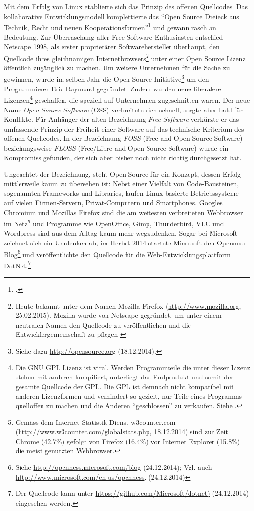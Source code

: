 \documentclass[
paper=164mm:234mm, %
pagesize, %
DIV=calc, %
10pt, %
parskip=half- %
]{scrbook}
\begin{document}
Mit dem Erfolg von Linux etablierte sich das Prinzip des offenen Quellcodes. Das kollaborative Entwicklungsmodell komplettierte das \enquote{Open Source Dreieck aus Technik, Recht und neuen Kooperationsformen}\footnote{\cite{Deterding:2007}.} und gewann rasch an Bedeutung. Zur Überraschung aller Free Software Enthusiasten entschied Netscape 1998, als erster proprietärer Softwarehersteller überhaupt, den Quellcode ihres gleichnamigen Internetbrowsers\footnote{Heute bekannt unter dem Namen Mozilla Firefox (\url{http://www.mozilla.org}, 25.02.2015). Mozilla wurde von Netscape gegründet, um unter einem neutralen Namen den Quellcode zu veröffentlichen und die Entwicklergemeinschaft zu pflegen \cite[91]{Hamerly-Paquin-Walton:1999}} unter einer Open Source Lizenz öffentlich zugänglich zu machen. Um weitere Unternehmen für die Sache zu gewinnen, wurde im selben Jahr die Open Source Initiative\footnote{Siehe dazu \url{http://opensource.org} (18.12.2014).} um den Programmierer Eric Raymond gegründet. Zudem wurden neue liberalere Lizenzen\footnote{Die GNU GPL Lizenz ist viral. Werden Programmteile die unter dieser Lizenz stehen mit anderen kompiliert, unterliegt das Endprodukt und somit der gesamte Quellcode der GPL. Die GPL ist demnach nicht kompatibel mit anderen Lizenzformen und verhindert so gezielt, nur Teile eines Programms quelloffen zu machen und die Anderen \enquote{geschlossen} zu verkaufen. Siehe \cite[93]{Hamerly-Paquin-Walton:1999}.} geschaffen, die speziell auf Unternehmen zugeschnitten waren. Der neue Name \emph{Open Source Software} (OSS) verbreitete sich schnell, sorgte aber bald für Konflikte. Für Anhänger der alten Bezeichnung \emph{Free Software} verkürzte er das umfassende Prinzip der Freiheit einer Software auf das technische Kriterium des offenen Quellcodes. In der Bezeichnung \emph{FOSS} (Free and Open Source Software) beziehungsweise \emph{FLOSS} (Free/Libre and Open Source Software) wurde ein Kompromiss gefunden, der sich aber bisher noch nicht richtig durchgesetzt hat.

Ungeachtet der Bezeichnung, steht Open Source für ein Konzept, dessen Erfolg mittlerweile kaum zu übersehen ist: Nebst einer Vielfalt von Code-Bausteinen, sogenannten Frameworks und Libraries, laufen Linux basierte Betriebssysteme auf vielen Firmen-Servern, Privat-Computern und Smartphones. Googles Chromium und Mozillas Firefox sind die am weitesten verbreiteten Webbrowser im Netz\footnote{Gemäss dem Internet Statistik Dienst w3counter.com (\url{http://www.w3counter.com/globalstats.php}, 18.12.2014) sind zur Zeit Chrome (42.7\%) gefolgt von Firefox (16.4\%) vor Internet Explorer (15.8\%) die meist genutzten Webbrowser.} und Programme wie OpenOffice, Gimp, Thunderbird, VLC und Wordpress sind aus dem Alltag kaum mehr wegzudenken. Sogar bei Microsoft zeichnet sich ein Umdenken ab, im Herbst 2014 startete Microsoft den Openness Blog\footnote{Siehe \url{http://openness.microsoft.com/blog} (24.12.2014); Vgl. auch \url{http://www.microsoft.com/en-us/openness}. (24.12.2014)} und veröffentlichte den Quellcode für die Web-Entwicklungsplattform DotNet.\footnote{Der Quellcode kann unter \url{https://github.com/Microsoft/dotnet)} (24.12.2014) eingesehen werden.}
\end{document}
